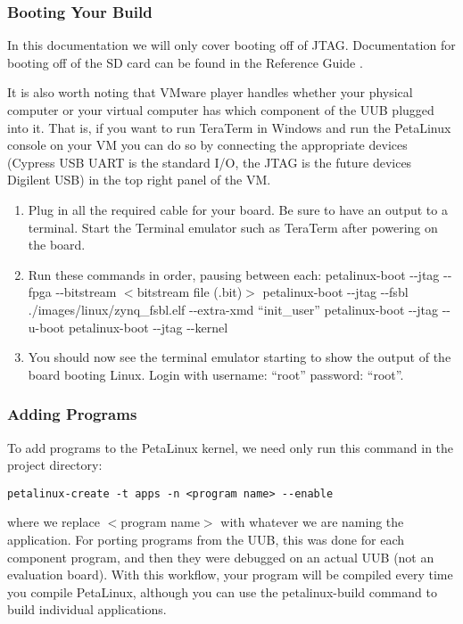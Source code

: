 \subsubsection{Booting Your Build}
In this documentation we will only cover booting off of JTAG. Documentation for booting off of the SD card can be found in the Reference Guide \cite{reference}.

It is also worth noting that VMware player handles whether your physical computer or your virtual computer has which component of the UUB plugged into it. That is, if you want to run TeraTerm in Windows and run the PetaLinux console on your VM you can do so by connecting the appropriate devices (Cypress USB UART is the standard I/O, the JTAG is the future devices Digilent USB) in the top right panel of the VM. 
\begin{enumerate}
\item Plug in all the required cable for your board. Be sure to have an output to a terminal. Start the Terminal emulator such as TeraTerm after powering on the board.
\item Run these commands in order, pausing between each:
\subitem petalinux-boot -{}-jtag -{}-fpga -{}-bitstream $<$bitstream file (.bit)$>$
\subitem petalinux-boot -{}-jtag -{}-fsbl ./images/linux/zynq\_fsbl.elf -{}-extra-xmd ``init\_user''
\subitem petalinux-boot -{}-jtag -{}-u-boot
\subitem petalinux-boot -{}-jtag -{}-kernel
\item You should now see the terminal emulator starting to show the output of the board booting Linux. Login with username: ``root'' password: ``root''. 
\end{enumerate}
\subsubsection{Adding Programs}
To add programs to the PetaLinux kernel, we need only run this command in the project directory:
\begin{verbatim}
petalinux-create -t apps -n <program name> --enable
\end{verbatim}
where we replace $<$program name$>$ with whatever we are naming the application. For porting programs from the UUB, this was done for each component program, and then they were debugged on an actual UUB (not an evaluation board). With this workflow, your program will be compiled every time you compile PetaLinux, although you can use the petalinux-build command to build individual applications.


